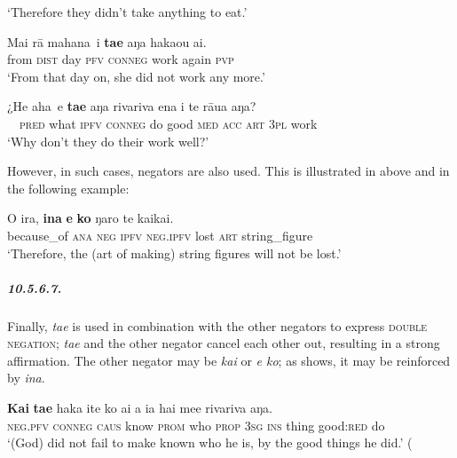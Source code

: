 \glt 
‘Therefore they didn’t take anything to eat.’ \textstyleExampleref{[R303.053]} 
\z

\ea\label{ex:10.157}
\gll {\ob}Mai rā mahana\,{\cb} i \textbf{ta{\ꞌ}e} aŋa haka{\ꞌ}ou ai.\\
{\db}from \textsc{dist} day \textsc{pfv} \textsc{conneg} work again \textsc{pvp}\\

\glt 
‘From that day on, she did not work any more.’ \textstyleExampleref{[R441.005]} 
\z

\ea\label{ex:10.158}
\gll ¿{\ob}He aha\,{\cb} e \textbf{ta{\ꞌ}e} aŋa rivariva ena i te rāua aŋa? \\
~~\textsc{pred} what \textsc{ipfv} \textsc{conneg} do good \textsc{med} \textsc{acc} \textsc{art} \textsc{3pl} work \\

\glt
‘Why don’t they do their work well?’ \textstyleExampleref{[R648.249]} 
\z

However, in such cases,  negators are also used. This is illustrated in  above and in the following example:

\ea\label{ex:10.159}
\gll {\ꞌ}O ira, \textbf{{\ꞌ}ina} \textbf{e} \textbf{ko} ŋaro te kaikai. \\
because\_of \textsc{ana} \textsc{neg} \textsc{ipfv} \textsc{neg.ipfv} lost \textsc{art} string\_figure \\

\glt 
‘Therefore, the (art of making) string figures will not be lost.’ \textstyleExampleref{[R648.133]} 
\z

\subparagraph{10.5.6.7.} Finally, \textit{ta{\ꞌ}e} is used in combination with the other negators to express \textsc{double negation}; \textit{ta{\ꞌ}e} and the other negator cancel each other out, resulting in a strong affirmation. The other negator may be \textit{kai} or \textit{e ko}; as  shows, it may be reinforced by \textit{{\ꞌ}ina}.

\ea\label{ex:10.160}
\gll \textbf{Kai} \textbf{ta{\ꞌ}e} haka {\ꞌ}ite ko ai a ia hai me{\ꞌ}e rivariva aŋa. \\
\textsc{neg.pfv} \textsc{conneg} \textsc{caus} know \textsc{prom} who \textsc{prop} \textsc{3sg} \textsc{ins} thing good:\textsc{red} do \\

\glt 
‘(God) did not fail to make known who he is, by the good things he did.’ (\textstyleExampleref{Acts 14:17]}\textstyleExampleref{} 
\z

